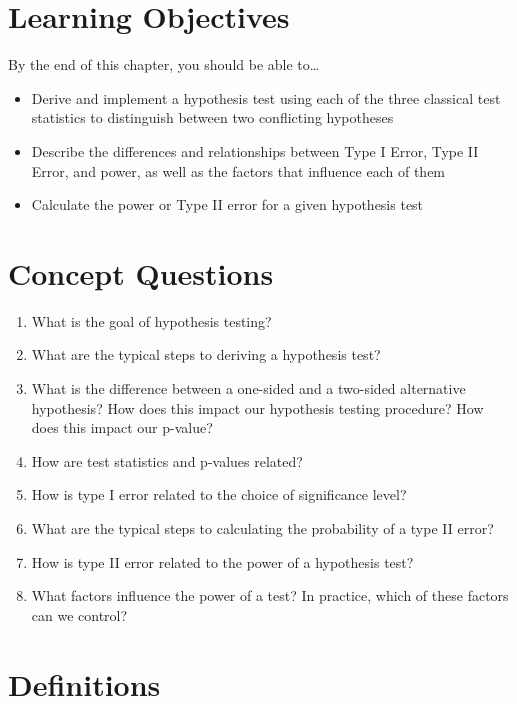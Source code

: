 \documentclass[
  letterpaper,
  DIV=11,
  numbers=noendperiod]{scrreprt}
\providecommand{\tightlist}{%
  \setlength{\itemsep}{0pt}\setlength{\parskip}{0pt}}\usepackage{longtable,booktabs,array}
\begin{document}
\section{Learning Objectives}\label{learning-objectives-6}

By the end of this chapter, you should be able to\ldots{}

\begin{itemize}
\tightlist
\item
  Derive and implement a hypothesis test using each of the three
  classical test statistics to distinguish between two conflicting
  hypotheses
\item
  Describe the differences and relationships between Type I Error, Type
  II Error, and power, as well as the factors that influence each of
  them
\item
  Calculate the power or Type II error for a given hypothesis test
\end{itemize}

\section{Concept Questions}\label{concept-questions-6}

\begin{enumerate}
\def\labelenumi{\arabic{enumi}.}
\tightlist
\item
  What is the goal of hypothesis testing?
\item
  What are the typical steps to deriving a hypothesis test?
\item
  What is the difference between a one-sided and a two-sided alternative
  hypothesis? How does this impact our hypothesis testing procedure? How
  does this impact our p-value?
\item
  How are test statistics and p-values related?
\item
  How is type I error related to the choice of significance level?
\item
  What are the typical steps to calculating the probability of a type II
  error?
\item
  How is type II error related to the power of a hypothesis test?
\item
  What factors influence the power of a test? In practice, which of
  these factors can we control?
\end{enumerate}

\section{Definitions}\label{definitions-6}
\end{document}
